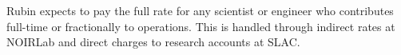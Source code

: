 Rubin expects to pay the full rate for any scientist or engineer who contributes full-time or fractionally to operations.
This is handled through indirect rates at \gls{NOIRLab} and direct charges to research accounts at \gls{SLAC}.






